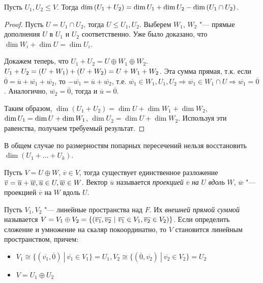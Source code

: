 \begin{theorem}
	Пусть $U_1, U_2 \le V$. Тогда $\dim{(U_1 + U_2)} = \dim{U_1} \hm{+} \dim{U_2} - \dim{(U_1 \cap U_2)}$.
\end{theorem}

\begin{proof}
	Пусть $U = U_1 \cap U_2$, тогда $U \le U_1, U_2$. Выберем $W_1$, $W_2$ "--- прямые дополнения $U$ в $U_1$ и $U_2$ соответственно. Уже было доказано, что $\dim{W_i} + \dim{U} = \dim{U_i}$.
	
	Докажем теперь, что $U_1 + U_2 = U \oplus W_1 \oplus W_2$. $U_1 + U_2 = (U + W_1) \hm{+} (U + W_2) = U + W_1 + W_2$. Эта сумма прямая, т.\:к. если $\overline{0} = \overline{u} + \overline{w_1} + \overline{w_2}$, то $-\overline{w_1} = \overline{u} + \overline{w_2}$, т.\:е. $\overline{w_1} \in W_1, U_1, U_2 \Rightarrow \overline{w_1} \in W_1 \cap U \Rightarrow \overline{w_1} = \overline{0}$. Аналогично, $\overline{w_2} = \overline{0}$, тогда и $\overline{u} = \overline{0}$.
	
	Таким образом, $\dim{(U_1 + U_2)} = \dim{U} + \dim{W_1} + \dim{W_2}$, $\dim{U_1} \hm{=} \dim{U} + \dim{W_1}$, $\dim{U_2} = \dim{U} + \dim{W_2}$. Используя эти равенства, получаем требуемый результат.
\end{proof}

\begin{note}
	В общем случае по размерностям попарных пересечений нельзя восстановить $\dim(U_1 + \dots + U_k)$.
\end{note}

\begin{definition}
	Пусть $V = U \oplus W$, $\overline{v} \in V$, тогда существует единственное разложение $\overline{v} = \overline{u} + \overline{w}, \overline{u} \hm{\in} U, \overline{w} \hm{\in} W$. Вектор $\overline{u}$ называется \textit{проекцией} $\overline{v}$ \textit{на} $U$ \textit{вдоль} $W$, $\overline{w}$ "--- проекцией $\overline{v}$ на $W$ вдоль $U$.
\end{definition}

\begin{note}
	Пусть $V_1, V_2$ "--- линейные пространства над $F$. Их \textit{внешней прямой суммой} называется $V = V_1 \oplus V_2 = \{(\overline{v_1}, \overline{v_2}~|~\overline{v_1} \in V_1, \overline{v_2} \hm{\in} V_2)\}$. Если определить сложение и умножение на скаляр покоординатно, то $V$ становится линейным пространством, причем:
	\begin{itemize}
		\item $V_1 \cong \{(\overline{v_1}, \overline{0})~|~\overline{v_1} \in V_1\} = U_1, V_2 \cong \{(\overline{0}, \overline{v_2})~|~\overline{v_2} \in V_2\} = U_2$
		\item $V = U_1 \oplus U_2$
	\end{itemize}
\end{note}
